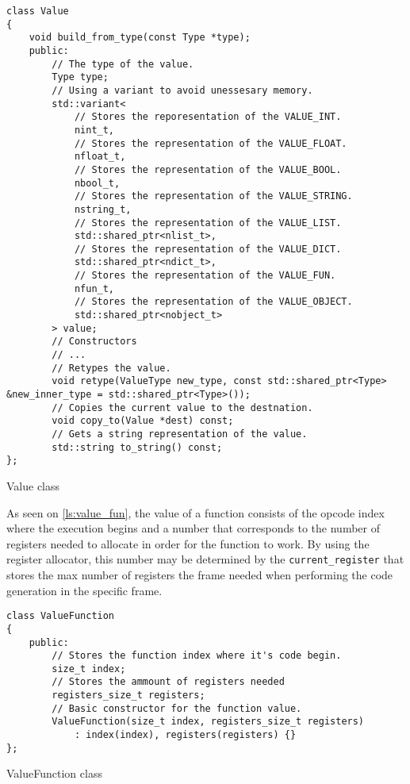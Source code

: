 \begin{listing}[H]
\begin{verbatim}
class Value
{
    void build_from_type(const Type *type);
    public:
        // The type of the value.
        Type type;
        // Using a variant to avoid unessesary memory.
        std::variant<
            // Stores the reporesentation of the VALUE_INT.
            nint_t,
            // Stores the representation of the VALUE_FLOAT.
            nfloat_t,
            // Stores the representation of the VALUE_BOOL.
            nbool_t,
            // Stores the representation of the VALUE_STRING.
            nstring_t,
            // Stores the representation of the VALUE_LIST.
            std::shared_ptr<nlist_t>,
            // Stores the representation of the VALUE_DICT.
            std::shared_ptr<ndict_t>,
            // Stores the representation of the VALUE_FUN.
            nfun_t,
            // Stores the representation of the VALUE_OBJECT.
            std::shared_ptr<nobject_t>
        > value;
        // Constructors
        // ...
        // Retypes the value.
        void retype(ValueType new_type, const std::shared_ptr<Type> &new_inner_type = std::shared_ptr<Type>());
        // Copies the current value to the destnation.
        void copy_to(Value *dest) const;
        // Gets a string representation of the value.
        std::string to_string() const;
};
\end{verbatim}
\caption{Value class}
\label{ls:value_class}
\end{listing}

As seen on \autoref{ls:value_fun}, the value of a function consists of the opcode index where the execution begins and a number
that corresponds to the number of registers needed to allocate in order for the function to work. By using the register allocator,
this number may be determined by the \texttt{current\_register} that stores the max number of registers the frame needed when performing
the code generation in the specific frame.

\begin{listing}[H]
\begin{verbatim}
class ValueFunction
{
    public:
        // Stores the function index where it's code begin.
        size_t index;
        // Stores the ammount of registers needed
        registers_size_t registers;
        // Basic constructor for the function value.
        ValueFunction(size_t index, registers_size_t registers)
            : index(index), registers(registers) {}
};
\end{verbatim}
\caption{ValueFunction class}
\label{ls:value_fun}
\end{listing}


